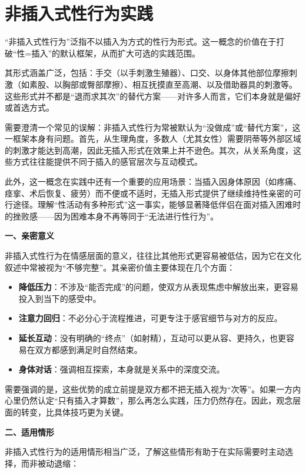 \documentclass[12pt,UTF8]{ctexbook}
\begin{document}
\chapter{非插入式性行为实践}

“非插入式性行为”泛指不以插入为方式的性行为形式。这一概念的价值在于打破“性=插入”的默认框架，从而扩大可选的实践范围。

其形式涵盖广泛，包括：手交（以手刺激生殖器）、口交、以身体其他部位摩擦刺激（如素股、以胸部或臀部摩擦）、相互抚摸直至高潮、以及借助器具的刺激等。这些形式并不都是“退而求其次”的替代方案——对许多人而言，它们本身就是偏好或首选方式。

需要澄清一个常见的误解：非插入式性行为常被默认为“没做成”或“替代方案”，这一框架本身有问题。首先，从生理角度，多数人（尤其女性）需要阴蒂等外部区域的刺激才能达到高潮，因此无插入形式在效果上并不逊色。其次，从关系角度，这些方式往往能提供不同于插入的感官层次与互动模式。

此外，这一概念在实践中还有一个重要的应用场景：当插入因身体原因（如疼痛、痉挛、术后恢复、疲劳）而不便或不适时，无插入形式提供了继续维持性亲密的可行途径。理解“性活动有多种形式”这一事实，能够显著降低伴侣在面对插入困难时的挫败感——因为困难本身不再等同于“无法进行性行为”。

\textbf{一、亲密意义}

非插入式性行为在情感层面的意义，往往比其他形式更容易被低估，因为它在文化叙述中常被视为“不够完整”。其亲密价值主要体现在几个方面：

\begin{itemize}
\item \textbf{降低压力}：不涉及“能否完成”的问题，使双方从表现焦虑中解放出来，更容易投入到当下的感受中。
\item \textbf{注意力回归}：不必分心于流程推进，可更专注于感官细节与对方的反应。
\item \textbf{延长互动}：没有明确的“终点”（如射精），互动可以更从容、更持久，也更容易在双方都感到满足时自然结束。
\item \textbf{身体对话}：强调相互探索，本身就是关系中的深度交流。
\end{itemize}

需要强调的是，这些优势的成立前提是双方都不把无插入视为“次等”。如果一方内心里仍然认定“只有插入才算数”，那么再怎么实践，压力仍然存在。因此，观念层面的转变，比具体技巧更为关键。

\textbf{二、适用情形}

非插入式性行为的适用情形相当广泛，了解这些情形有助于在实际需要时主动选择，而非被动退缩：
\end{document}
